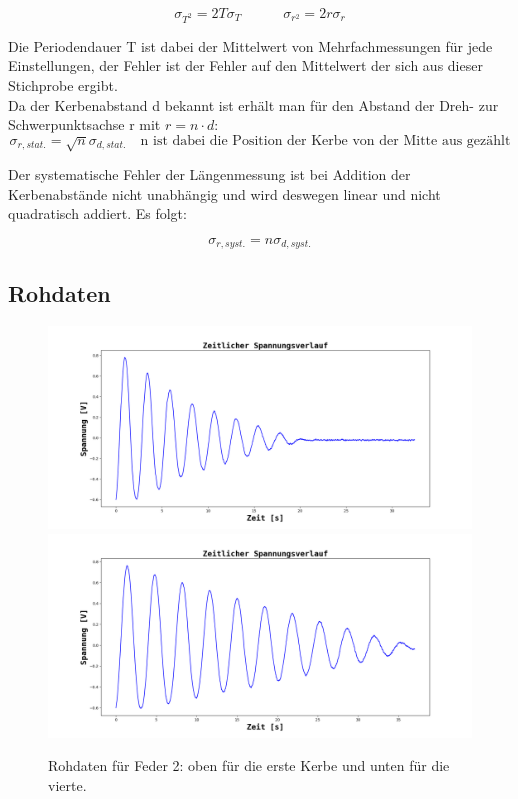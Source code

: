 \documentclass[12pt,a4paper]{article}
\begin{document}
\begin{equation}
\sigma_{T^2}=2 T \sigma_T \quad \quad \quad
\sigma_{r^2}=2r \sigma_r
\end{equation}

Die Periodendauer T ist dabei der Mittelwert von Mehrfachmessungen für jede Einstellungen, der Fehler ist der Fehler auf den Mittelwert der sich aus dieser Stichprobe ergibt.\\
Da der Kerbenabstand d bekannt ist erhält man für den Abstand der Dreh- zur Schwerpunktsachse r mit $r = n \cdot d$:
\begin{equation}
\sigma_{r,stat.}=\sqrt{n} \sigma_{d,stat.} \quad \text{n ist dabei die Position der Kerbe von der Mitte aus gezählt}
\end{equation}

Der systematische Fehler der Längenmessung ist bei Addition der Kerbenabstände nicht unabhängig und wird deswegen linear und nicht quadratisch addiert. Es folgt:

\begin{equation}
\sigma_{r,syst.}=n \sigma_{d,syst.}
\end{equation}


\subsection{Rohdaten}
\begin{figure}
\begin{center}
\includegraphics[scale=0.4]{Bilder/Steiner_Feder2_Kerbe_1_roh.png}
\includegraphics[scale=0.4]{Bilder/Steiner_Feder2_Kerbe_4_roh.png}
\end{center}
\caption{Rohdaten für Feder 2: oben für die erste Kerbe und unten für die vierte.}
\label{fig:SteinerRoh2}
\end{figure}
\end{document}
